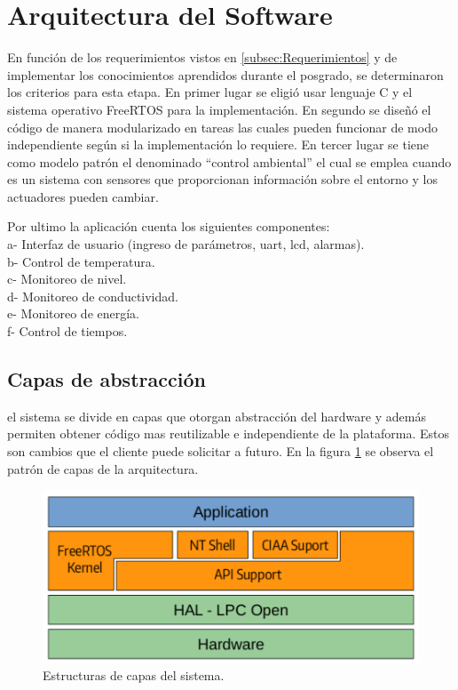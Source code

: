 \section{ Arquitectura del Software }

En función de los requerimientos vistos en \ref{subsec:Requerimientos} y de implementar los conocimientos aprendidos durante el posgrado, se determinaron los criterios para esta etapa. 
En primer lugar se eligió usar lenguaje C y el sistema operativo FreeRTOS para la implementación. 
En segundo se diseñó el código de manera modularizado en tareas las cuales pueden funcionar de modo independiente según si la implementación lo requiere. 
En tercer lugar se tiene como modelo patrón el denominado \enquote{control ambiental} el cual se emplea cuando es un sistema con sensores que proporcionan información sobre el entorno y los actuadores pueden cambiar.

Por ultimo la aplicación cuenta los siguientes componentes:\\
a- Interfaz de usuario (ingreso de parámetros, uart, lcd, alarmas). \\
b- Control de temperatura.\\
c- Monitoreo de nivel.\\
d- Monitoreo de conductividad.\\
e- Monitoreo de energía.\\
f- Control de tiempos.\\

\subsection{ Capas de abstracción }

el sistema se divide en capas que otorgan abstracción del hardware y además permiten obtener código mas reutilizable e independiente de la plataforma. Estos son cambios que el cliente puede solicitar a futuro.
En la figura \ref{fig:diagrama_capas} se observa el patrón de capas de la arquitectura.

\begin{figure}[h!]
	\centering
	\includegraphics[width=.8\textwidth]{Figures/Cap_3/diagrama_capas}
	\caption{Estructuras de capas del sistema.}
	\label{fig:diagrama_capas}
\end{figure}
 
